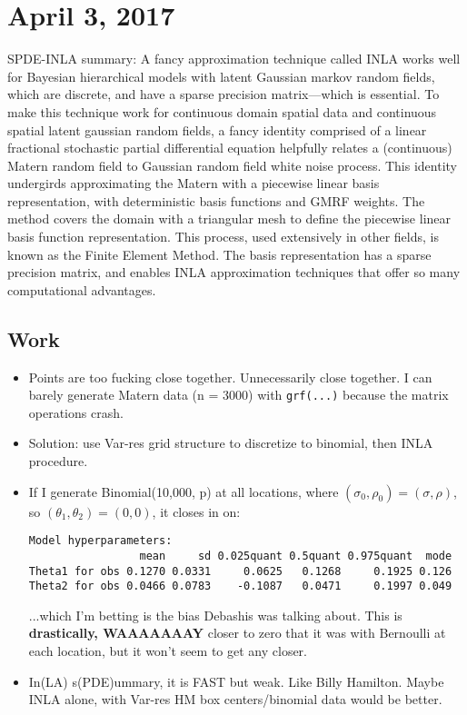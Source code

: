 \documentclass{article}
\begin{document}
\section*{April 3, 2017}
SPDE-INLA summary: A fancy approximation technique called INLA works well for Bayesian hierarchical models with latent Gaussian markov random fields, which are discrete, and have a sparse precision matrix---which is essential. To make this technique work for continuous domain spatial data and continuous spatial latent gaussian random fields, a fancy identity comprised of a linear fractional stochastic partial differential equation helpfully relates a (continuous) Matern random field to Gaussian random field white noise process. This identity undergirds approximating the Matern with a piecewise linear basis representation, with deterministic basis functions and GMRF weights. The method covers the domain with a triangular mesh to define the piecewise linear basis function representation. This process, used extensively in other fields, is known as the Finite Element Method. The basis representation has a sparse precision matrix, and enables INLA approximation techniques that offer so many computational advantages.

\subsection*{Work}
\begin{itemize}
\item Points are too fucking close together. Unnecessarily close together. I can barely generate Matern data (n = 3000) with \verb|grf(...)| because the matrix operations crash.
\item Solution: use Var-res grid structure to discretize to binomial, then INLA procedure.
\item If I generate Binomial(10,000, p) at all locations, where $(\sigma_{0}, \rho_{0}) = (\sigma, \rho)$, so $(\theta_{1}, \theta_{2}) = (0,0)$, it closes in on:
\begin{verbatim}
Model hyperparameters:
                 mean     sd 0.025quant 0.5quant 0.975quant  mode
Theta1 for obs 0.1270 0.0331     0.0625   0.1268     0.1925 0.126
Theta2 for obs 0.0466 0.0783    -0.1087   0.0471     0.1997 0.049
\end{verbatim}
...which I'm betting is the bias Debashis was talking about. This is {\bf drastically, WAAAAAAAY} closer to zero that it was with Bernoulli at each location, but it won't seem to get any closer.
\item In(LA) s(PDE)ummary, it is FAST but weak. Like Billy Hamilton. Maybe INLA alone, with Var-res HM box centers/binomial data would be better.
\end{itemize}
\end{document}
